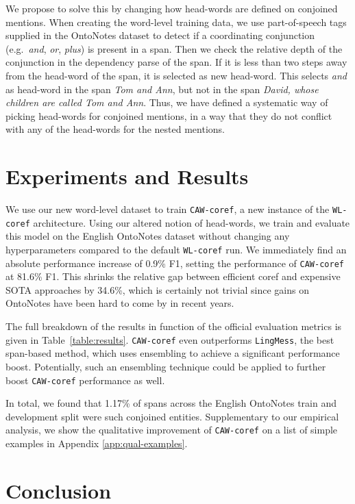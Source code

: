 \documentclass[11pt]{article}
\newcommand\wlcoref{{\texttt{WL-coref}}}
\newcommand\cawcoref{{\texttt{CAW-coref}}}
\begin{document}
We propose to solve this by changing how head-words are defined on conjoined mentions. When creating the word-level training data, we use part-of-speech tags supplied in the OntoNotes dataset to detect if a coordinating conjunction (e.g.~\emph{and}, \emph{or}, \emph{plus}) is present in a span. Then we check the relative depth of the conjunction in the dependency parse of the span. If it is less than two steps away from the head-word of the span, it is selected as new head-word. This selects \emph{and} as head-word in the span \emph{Tom and Ann}, but not in the span \emph{David, whose children are called Tom and Ann}. Thus, we have defined a systematic way of picking head-words for conjoined mentions, in a way that they do not conflict with any of the head-words for the nested mentions.




\section{Experiments and Results}
We use our new word-level dataset to train \cawcoref{}, a new instance of the \wlcoref{} architecture. Using our altered notion of head-words, we train and evaluate this model on the English OntoNotes dataset without changing any hyperparameters compared to the default \wlcoref{} run. We immediately find an absolute performance increase of 0.9\% F1, setting the performance of \cawcoref{} at 81.6\% F1. This shrinks the relative gap between efficient coref and expensive SOTA approaches by 34.6\%, which is certainly not trivial since gains on OntoNotes have been hard to come by in recent years. 

The full breakdown of the results in function of the official evaluation metrics \citep{vilain-etal-1995-model, Bagga1998AlgorithmsFS, luo-2005-coreference, pradhan-etal-2012-conll}
is given in Table~\ref{table:results}. \cawcoref{} even outperforms \texttt{LingMess}, the best span-based method, which uses ensembling to achieve a significant performance boost. Potentially, such an ensembling technique could be applied to further boost \cawcoref{} performance as well.

In total, we found that 1.17\% of spans across the English OntoNotes train and development split were such conjoined entities. Supplementary to our empirical analysis, we show the qualitative improvement of \cawcoref{} on a list of simple examples in Appendix \ref{app:qual-examples}.



\section{Conclusion}
\end{document}
